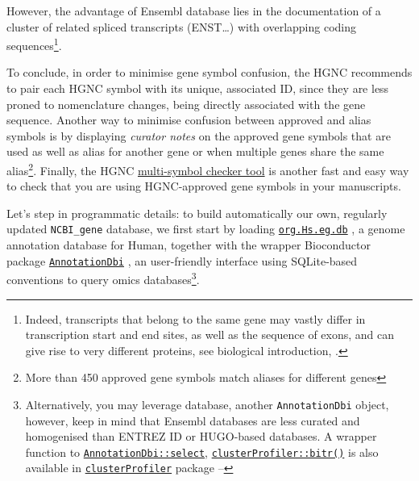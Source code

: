 However, the advantage of Ensembl database lies in the documentation of a cluster of related spliced transcripts (ENST\ldots) with overlapping coding sequences\footnote{Indeed, transcripts that belong to the same gene may vastly differ in transcription start and end sites, as well as the sequence of exons, and can give rise to very different proteins, see biological introduction, .}.

To conclude, in order to minimise gene symbol confusion, the HGNC recommends to pair each HGNC symbol with its unique, associated ID, since they are less proned to nomenclature changes, being directly associated with the gene sequence. Another way to minimise confusion between approved and alias symbols is by displaying \emph{curator notes} on the approved gene symbols that are used as well as alias for another gene or when multiple genes share the same alias\footnote{More than 450 approved gene symbols match aliases for different genes}. Finally, the HGNC \href{https://www.genenames.org/tools/multi-symbol-checker/}{multi-symbol checker tool} is another fast and easy way to check that you are using HGNC-approved gene symbols in your manuscripts.

Let's step in programmatic details: to build automatically our own, regularly updated \texttt{NCBI\_gene} database, we first start by loading \href{NA}{\texttt{org.Hs.eg.db}} \autocite{R-org-Hs-eg-db}, a genome annotation database for Human, together with the wrapper Bioconductor package \href{NA}{\texttt{AnnotationDbi}} \autocite{R-AnnotationDbi}, an user-friendly interface using SQLite-based conventions to query omics databases\footnote{Alternatively, you may leverage \autocite{R-EnsDb-Hsapiens-v86} database, another \texttt{AnnotationDbi} object, however, keep in mind that Ensembl databases are less curated and homogenised than ENTREZ ID or HUGO-based databases. A wrapper function to \href{https://rdrr.io/pkg/AnnotationDbi/man/AnnotationDb-class.html}{\texttt{AnnotationDbi::select}}, \href{https://rdrr.io/pkg/clusterProfiler/man/bitr.html}{\texttt{clusterProfiler::bitr()}} is also available in \href{NA}{\texttt{clusterProfiler}} package \autocite{R-clusterProfiler}--\autocite{clusterProfiler2012}}.


